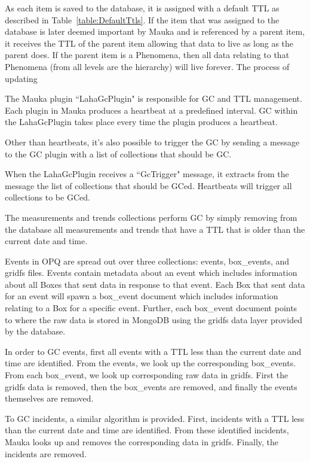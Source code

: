 As each item is saved to the database, it is assigned with a default TTL as described in Table~\ref{table:DefaultTtls}. If the item that was assigned to the database is later deemed important by Mauka and is referenced by a parent item, it receives the TTL of the parent item allowing that data to live as long as the parent does. If the parent item is a Phenomena, then all data relating to that Phenomena (from all levels are the hierarchy) will live forever. The process of updating

The Mauka plugin ``LahaGcPlugin" is responsible for GC and TTL management. Each plugin in Mauka produces a heartbeat at a predefined interval. GC within the LahaGcPlugin takes place every time the plugin produces a heartbeat.

Other than heartbeats, it's also possible to trigger the GC by sending a message to the GC plugin with a list of collections that should be GC\@.

When the LahaGcPlugin receives a ``GcTrigger" message, it extracts from the message the list of collections that should be GCed. Heartbeats will trigger all collections to be GCed.

The measurements and trends collections perform GC by simply removing from the database all measurements and trends that have a TTL that is older than the current date and time.

Events in OPQ are spread out over three collections: events, box\_events, and gridfs files. Events contain metadata about an event which includes information about all Boxes that sent data in response to that event. Each Box that sent data for an event will spawn a box\_event document which includes information relating to a Box for a specific event. Further, each box\_event document points to where the raw data is stored in MongoDB using the gridfs data layer provided by the database.

In order to GC events, first all events with a TTL less than the current date and time are identified. From the events, we look up the corresponding box\_events. From each box\_event, we look up corresponding raw data in gridfs. First the gridfs data is removed, then the box\_events are removed, and finally the events themselves are removed.

To GC incidents, a similar algorithm is provided. First, incidents with a TTL less than the current date and time are identified. From these identified incidents, Mauka looks up and removes the corresponding data in gridfs. Finally, the incidents are removed.

